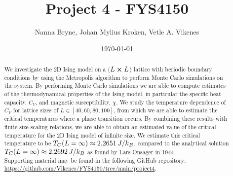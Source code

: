 



\title{Project 4 - FYS4150} 
\author{Nanna Bryne, Johan Mylius Kroken, Vetle A. Vikenes} 
\date{\today}                             
\noaffiliation                            

\begin{abstract}
    We investigate the 2D Ising model on a ($L\cross L$) lattice with beriodic boundary conditions by using the Metropolis algorithm to perform Monte Carlo simulations on the system. By performing Monte Carlo simulations we are able to compute estimates of the thermodynamical properties of the Ising model, in particular the specific heat capacity, $C_V$, and magnetic susceptibility, $\chi$. We study the temperature dependence of $C_V$ for lattice sizes of $L\in[40,60,80,100]$, from which we are able to estimate the critical temperatures where a phase transition occurs. By combining these results with finite size scaling relations, we are able to obtain an estimated value of the critical temperature for the 2D Ising model of infinite size. We estimate this critical temperature to be $T_C(L=\infty) \approx 2.2651\,J/k_B$, compared to the analytical solution $T_C(L=\infty) \approx 2.2692\,J/k_B$ as found by Lars Onsager in 1944 \cite{Onsager_Ising2D}\\
    Supporting material may be found in the following GitHub repository: \url{https://github.com/Vikenes/FYS4150/tree/main/project4}.
\end{abstract}
\maketitle
















\newpage


\newpage

 



